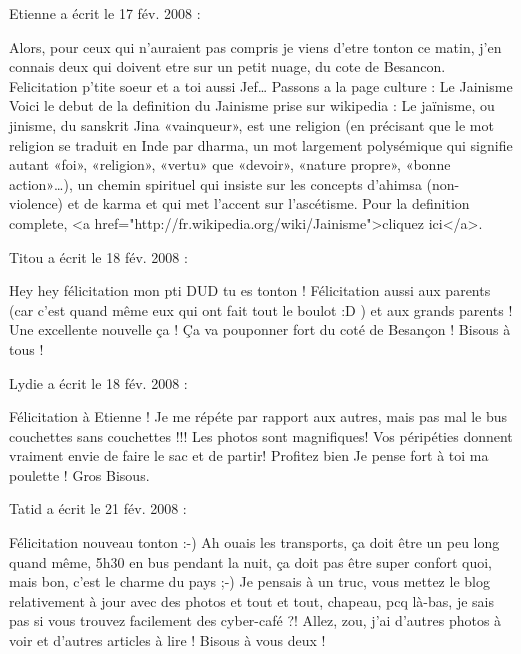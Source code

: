 \medskip
Etienne a écrit le 17 fév. 2008 :
\begin{displayquote}
Alors, pour ceux qui n'auraient pas compris je viens d'etre tonton ce matin, j'en connais deux qui doivent etre sur un petit nuage, du cote de Besancon. Felicitation p'tite soeur et a toi aussi Jef\dots
Passons a la page culture : Le Jainisme
Voici le debut de la definition du Jainisme prise sur wikipedia : Le jaïnisme, ou jinisme, du sanskrit Jina «vainqueur», est une religion (en précisant que le mot religion se traduit en Inde par dharma, un mot largement polysémique qui signifie autant «foi», «religion», «vertu» que «devoir», «nature propre», «bonne action»\dots), un chemin spirituel qui insiste sur les concepts d'ahimsa (non-violence) et de karma et qui met l'accent sur l'ascétisme.
Pour la definition complete, <a href="http://fr.wikipedia.org/wiki/Jainisme">cliquez ici</a>.
\end{displayquote}

\medskip
Titou a écrit le 18 fév. 2008 :
\begin{displayquote}
Hey hey félicitation mon pti DUD tu es tonton ! Félicitation aussi aux parents (car c'est quand même eux qui ont fait tout le boulot :D )  et aux grands parents ! Une excellente nouvelle ça ! Ça va pouponner fort du coté de Besançon ! Bisous à tous !
\end{displayquote}

\medskip
Lydie a écrit le 18 fév. 2008 :
\begin{displayquote}
Félicitation à Etienne !
Je me répéte par rapport aux autres, mais pas mal le bus couchettes sans couchettes !!!
Les photos sont magnifiques! Vos péripéties donnent vraiment envie de faire le sac et de partir!
Profitez bien
Je pense fort à toi ma poulette !
Gros Bisous.
\end{displayquote}

\medskip
Tatid a écrit le 21 fév. 2008 :
\begin{displayquote}
Félicitation nouveau tonton :-)
Ah ouais les transports, ça doit être un peu long quand même, 5h30 en bus pendant la nuit, ça doit pas être super confort quoi, mais bon, c'est le charme du pays ;-)
Je pensais à un truc, vous mettez le blog relativement à jour avec des photos et tout et tout, chapeau, pcq là-bas, je sais pas si vous trouvez facilement des cyber-café ?!
Allez, zou, j'ai d'autres photos à voir et d'autres articles à lire !
Bisous à vous deux !
\end{displayquote}

\vfill
